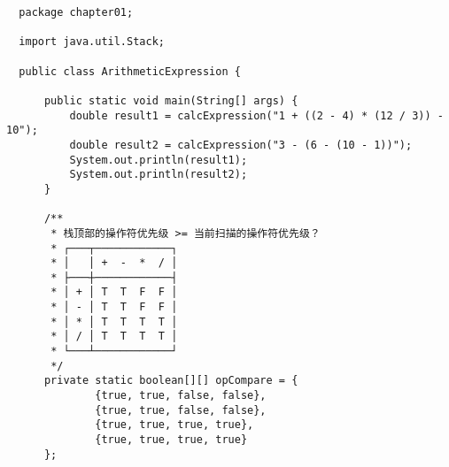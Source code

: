\documentclass{article}
\begin{document}
  \begin{verbatim}
  package chapter01;

  import java.util.Stack;

  public class ArithmeticExpression {

      public static void main(String[] args) {
          double result1 = calcExpression("1 + ((2 - 4) * (12 / 3)) - 10");
          double result2 = calcExpression("3 - (6 - (10 - 1))");
          System.out.println(result1);
          System.out.println(result2);
      }

      /**
       * 栈顶部的操作符优先级 >= 当前扫描的操作符优先级？
       * ┌───┬────────────┐
       * │   │ +  -  *  / │
       * ├───┼────────────┤
       * │ + │ T  T  F  F │
       * │ - │ T  T  F  F │
       * │ * │ T  T  T  T │
       * │ / │ T  T  T  T │
       * └───┴────────────┘
       */
      private static boolean[][] opCompare = {
              {true, true, false, false},
              {true, true, false, false},
              {true, true, true, true},
              {true, true, true, true}
      };


\end{verbatim}
\end{document}
